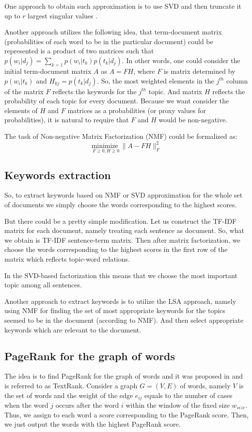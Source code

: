 \documentclass[a4paper]{article}
\begin{document}
One approach to obtain such approximation is to use SVD  and then truncate it up to $r$ largest singular values \cite{LSAfounds}.

Another approach utilizes the following idea, that term-document matrix (probabilities of each word to be in the particular document) could be represented is a product of two matrices such that $p(w_i | d_j) = \sum_{k=1} p(w_i | t_k)p(t_k | d_j)$. In other words, one could consider the initial term-document matrix $A$ as $A=FH$, where $F$ is matrix determined by $p(w_i|t_k)$ and $H_{kj} = p(t_k | d_j)$. So, the most weighted elements in the $j^{th}$ column of the matrix $F$ reflects the keywords for the $j^{th}$ topic. And matrix $H$ reflects the probability of each topic for every document. Because we want consider the elements of $H$ and $F$ matrices as a probabilities (or proxy values for probabilities), it is natural to require that $F$ and $H$ would be non-negative.

The task of Non-negative Matrix Factorization \cite{NMF:topics} (NMF) could be formalized as:
$$
\underset{F \geq 0, H \geq 0}{\text{minimize }} \|A - FH\|_{F}^2
$$

\subsection*{Keywords extraction}

So, to extract keywords based on NMF or SVD approximation for the whole set of documents we simply choose the words corresponding to the highest scores.

But there could be a pretty simple modification. Let us construct the TF-IDF matrix for each document, namely treating each sentence as document. So, what we obtain is TF-IDF sentence-term matrix. Then after matrix factorization, we choose the words corresponding to the highest scores in the first row of the matrix which reflects topic-word relations.

In the SVD-based factorization this means that we choose the most important topic among all sentences.


Another approach to extract keywords is to utilize the LSA approach, namely using NMF for finding the set of most appropriate keywords for the topics seemed to be in the document (according to NMF). And then select appropriate keywords which are relevant to the document.

\subsection*{PageRank for the graph of words}
The idea is to find PageRank for the graph of words and it was proposed in \cite{Mihalcea04TextRank} and is referred to as TextRank. Consider a graph $G = (V, E)$ of words, namely $V$ is the set of words and the weight of the edge $e_{ij}$ equals to the number of cases when the word $j$ occurs after the word $i$ within the window of the fixed size $w_{size}$. Thus, we assign to each word a score corresponding to the PageRank score. Then, we just output the words with the highest PageRank score.
\end{document}
